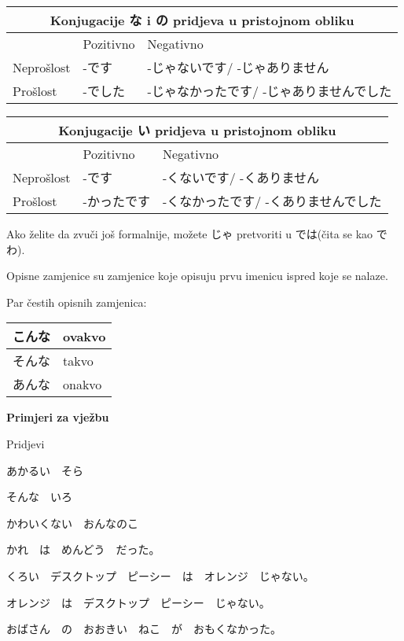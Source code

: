 	\vspace{10pt}
	\begin{tabular}{|l||l|l|}
		\hline
		\multicolumn{3}{c}{Konjugacije な i の pridjeva u pristojnom obliku}\\\hline
		 &Pozitivno&Negativno\\\hline
		Neprošlost&-です&-じゃないです/ -じゃありません\\\hline
		Prošlost&-でした&-じゃなかったです/ -じゃありませんでした\\\hline
	\end{tabular}
	
		\vspace{10pt}
	\begin{tabular}{|l||l|l|}
		\hline
		\multicolumn{3}{c}{Konjugacije い pridjeva u pristojnom obliku}\\\hline
		 &Pozitivno&Negativno\\\hline
		Neprošlost&-です&-くないです/ -くありません\\\hline
		Prošlost&-かったです&-くなかったです/ -くありませんでした\\\hline
	\end{tabular}
	
\vspace{10pt}


Ako želite da zvuči još formalnije, možete じゃ pretvoriti u では(čita se kao でわ).

\iffalse
{}

Opisne zamjenice su zamjenice koje opisuju prvu imenicu ispred koje se nalaze.


Par čestih opisnih zamjenica:

 	\vspace{10pt}
	\begin{tabular}{|l|l|}
		\hline
		こんな&ovakvo\\\hline
		そんな&takvo\\\hline
		あんな&onakvo\\\hline
	\end{tabular}
\vspace{10pt}

	\begin{reibun}
	\end{reibun}

	
	\normalsize \textbf{Primjeri za vježbu}
	
	\begin{mondai}{Pridjevi}
		\item あかるい　そら
		\item そんな　いろ
		\item かわいくない　おんなのこ
		\item かれ　は　めんどう　だった。
		\item くろい　デスクトップ　ピーシー　は　オレンジ　じゃない。
		\item オレンジ　は　デスクトップ　ピーシー　じゃない。
		\item おばさん　の　おおきい　ねこ　が　おもくなかった。
	\end{mondai}

